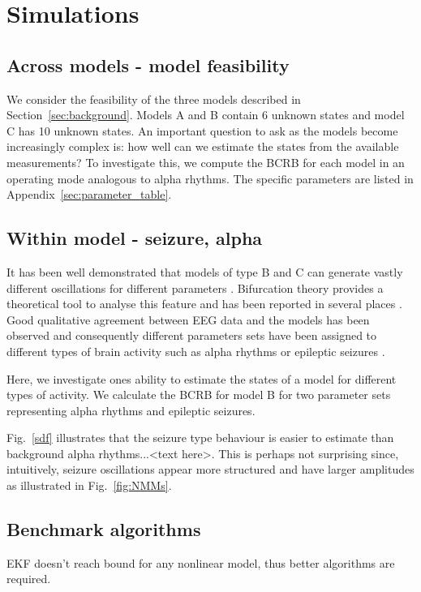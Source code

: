 \documentclass{article}
\begin{document}
\section{Simulations}

\subsection{Across models - model feasibility}

We consider the feasibility of the three models described in Section~\ref{sec:background}. Models A and B contain 6 unknown states and model C has 10 unknown states. An important question to ask as the models become increasingly complex is: how well can we estimate the states from the available measurements? To investigate this, we compute the BCRB for each model in an operating mode analogous to alpha rhythms. The specific parameters are listed in Appendix~\ref{sec:parameter_table}.


\subsection{Within model - seizure, alpha}

It has been well demonstrated that models of type B and C can generate vastly different oscillations for different parameters \cite{sdf}. Bifurcation theory provides a theoretical tool to analyse this feature and has been reported in several places \cite{sdf}. Good qualitative agreement between EEG data and the models has been observed and consequently different parameters sets have been assigned to different types of brain activity such as alpha rhythms or epileptic seizures \cite{sfd}.

Here, we investigate ones ability to estimate the states of a model for different types of activity. We calculate the BCRB for model B for two parameter sets representing alpha rhythms and epileptic seizures.

Fig.~\ref{sdf} illustrates that the seizure type behaviour is easier to estimate than background alpha rhythms...<text here>. This is perhaps not surprising since, intuitively, seizure oscillations appear more structured and have larger amplitudes as illustrated in Fig.~\ref{fig:NMMs}.

\subsection{Benchmark algorithms}

EKF doesn't reach bound for any nonlinear model, thus better algorithms are required.
\end{document}
